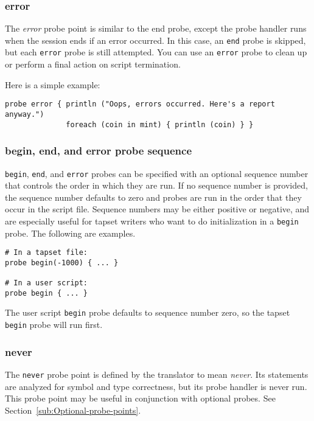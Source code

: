 \documentclass[twoside,english]{article}
\newenvironment{vindent}
{\begin{list}{}{\setlength{\listparindent}{6pt}}
\item[]}
{\end{list}}
\begin{document}
\subsubsection{error}
The \emph{error} probe point is similar to the end
probe, except the probe handler runs when the session ends if an error
occurred.  In this case, an \texttt{end} probe is skipped, but each
\texttt{error} probe is still attempted.  You can use an
\texttt{error} probe to clean up or perform a final action on script
termination.

Here is a simple example:
\begin{vindent}
\begin{verbatim}
probe error { println ("Oops, errors occurred. Here's a report anyway.")
              foreach (coin in mint) { println (coin) } }
\end{verbatim}
\end{vindent}


\subsubsection{begin, end, and error probe sequence}
\texttt{begin}, \texttt{end}, and \texttt{error} probes can be
specified with an optional sequence number that controls the order in
which they are run. If no sequence number is provided, the sequence
number defaults to zero and probes are run in the order that they
occur in the script file. Sequence numbers may be either positive or
negative, and are especially useful for tapset writers who want to do
initialization in a \texttt{begin} probe. The following are examples.

\begin{vindent}
\begin{verbatim}
# In a tapset file:
probe begin(-1000) { ... }

# In a user script:
probe begin { ... }
\end{verbatim}
\end{vindent}
The user script \texttt{begin} probe defaults to sequence number zero, so
the tapset \texttt{begin} probe will run first.


\subsubsection{never}
The \texttt{never} probe point is defined by the translator to mean \emph{never}.
Its statements are analyzed for symbol and type correctness, but its probe
handler is never run. This probe point may be useful in conjunction with
optional probes. See Section~\ref{sub:Optional-probe-points}.
\end{document}
